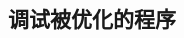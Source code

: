 \documentclass[class=book, crop=false]{standalone}
\begin{document}
\begin{CJK}{UTF8}{gbsn}

\chapter{调试被优化的程序}







\cleardoublepage

\end{CJK}
\end{document}
